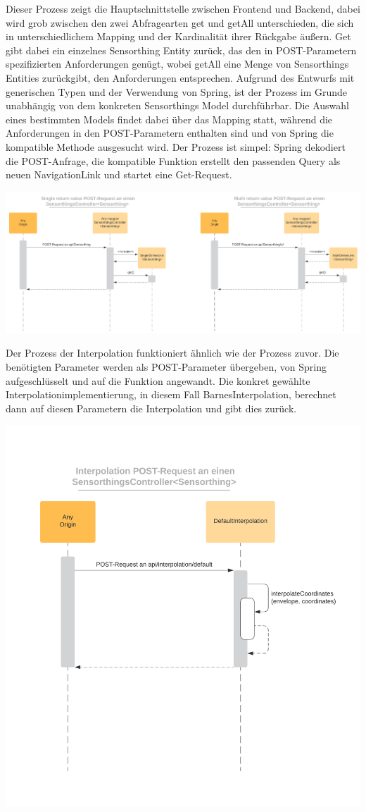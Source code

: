 Dieser Prozess zeigt die Hauptschnittstelle zwischen Frontend und Backend, dabei wird grob zwischen den zwei Abfragearten get und getAll unterschieden, die sich in unterschiedlichem Mapping und der Kardinalität ihrer Rückgabe äußern.
Get gibt dabei ein einzelnes Sensorthing Entity zurück, das den in POST-Parametern spezifizierten Anforderungen genügt, wobei getAll eine Menge von Sensorthings Entities zurückgibt, den Anforderungen entsprechen.
Aufgrund des Entwurfs mit generischen Typen und der Verwendung von Spring, ist der Prozess im Grunde unabhängig von dem konkreten Sensorthings Model durchführbar.
Die Auswahl eines bestimmten Models findet dabei über das Mapping statt, während die Anforderungen in den POST-Parametern enthalten sind und von Spring die kompatible Methode ausgesucht wird.
Der Prozess ist simpel: Spring dekodiert die POST-Anfrage, die kompatible Funktion erstellt den passenden Query als neuen NavigationLink und startet eine Get-Request.
\begin{center}
\includegraphics[scale=0.12]{media/backend/processes/SingleAndMultiReturnPost.png}
\end{center}
Der Prozess der Interpolation funktioniert ähnlich wie der Prozess zuvor. Die benötigten Parameter werden als POST-Parameter übergeben, von Spring aufgeschlüsselt und auf die Funktion angewandt. Die konkret gewählte Interpolationimplementierung, in diesem Fall BarnesInterpolation,
berechnet dann auf diesen Parametern die Interpolation und gibt dies zurück.
\begin{center}
\includegraphics[scale=0.12]{media/backend/processes/Interpolation.png}
\end{center}
